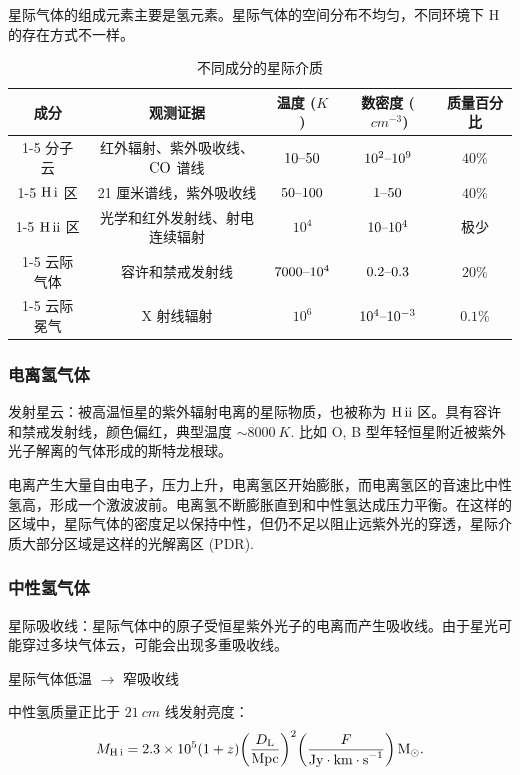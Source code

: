 \documentclass[../天体物理基础.tex]{subfiles}
\begin{document}
星际气体的组成元素主要是氢元素。星际气体的空间分布不均匀，不同环境下 H 的存在方式不一样。
\begin{table}[!htbp]
\centering
\caption{不同成分的星际介质}
\begin{tabular}{c c c c c}
\hline
成分 & 观测证据 & 温度 ($\unit{K}$) & 数密度 ($\qty{}{cm^{-3}}$) & 质量百分比\\
\cline{1-5}
分子云 & 红外辐射、紫外吸收线、$\ce{CO}$ 谱线 & $10\text{\textendash}50$ & $10^{2}\text{\textendash}10^{9}$ & $40\%$\\
\cline{1-5}
$\ce{H}\,\mathrm{\uppercase\expandafter{\romannumeral1}}$ 区 & 21 厘米谱线，紫外吸收线 & $50\text{\textendash}100$ & $1\text{\textendash}50$ & $40\%$\\
\cline{1-5}
$\ce{H}\,\mathrm{\uppercase\expandafter{\romannumeral2}}$ 区 & 光学和红外发射线、射电连续辐射 & $10^{4}$ & $10\text{\textendash}10^{4}$ & 极少\\
\cline{1-5}
云际气体 & 容许和禁戒发射线 & $7000\text{\textendash}10^{4}$ & $0.2\text{\textendash}0.3$ & $20\%$\\
\cline{1-5}
云际冕气 & X 射线辐射 & $10^{6}$ & $10^{4}\text{\textendash}10^{-3}$ & $0.1\%$\\
\hline
\end{tabular}
\label{不同成分的星际介质}
\end{table}

\subsubsection{电离氢气体}
发射星云：被高温恒星的紫外辐射电离的星际物质，也被称为 $\ce{H}\,\mathrm{\uppercase\expandafter{\romannumeral2}}$ 区。具有容许和禁戒发射线，颜色偏红，典型温度 $\sim\qty{8000}{K}$. 比如 O, B 型年轻恒星附近被紫外光子解离的气体形成的斯特龙根球。

电离产生大量自由电子，压力上升，电离氢区开始膨胀，而电离氢区的音速比中性氢高，形成一个激波波前。电离氢不断膨胀直到和中性氢达成压力平衡。在这样的区域中，星际气体的密度足以保持中性，但仍不足以阻止远紫外光的穿透，星际介质大部分区域是这样的光解离区 (PDR).

\subsubsection{中性氢气体}
星际吸收线：星际气体中的原子受恒星紫外光子的电离而产生吸收线。由于星光可能穿过多块气体云，可能会出现多重吸收线。

星际气体低温 $\to$ 窄吸收线

中性氢质量正比于 $\qty{21}{cm}$ 线发射亮度：
\begin{equation}
M_{\ce{H}\,\mathrm{\uppercase\expandafter{\romannumeral1}}}=2.3\times10^{5}\mleft(1+z\mright)\mleft(\frac{D_{\mathrm{L}}}{\unit{Mpc}}\mright)^{2}\mleft(\frac{F}{\unit{Jy\cdot km\cdot s^{-1}}}\mright)\,\unit{M_{\odot}}.
\end{equation}
\end{document}
